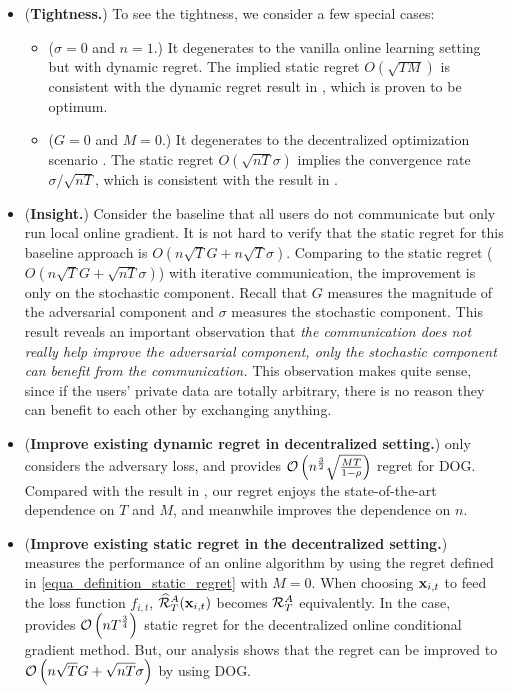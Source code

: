 \documentclass{article}
\begin{document}
\begin{itemize}
\item ({\bf Tightness.}) To see the tightness, we consider a few special cases:
\begin{itemize}
\item ($\sigma= 0$ and $n=1$.) It degenerates to the vanilla online learning setting but with dynamic regret. The implied static regret $O(\sqrt{TM})$ is consistent with the dynamic regret result in \citet{Zhao:2018wx}, which is proven to be optimum. 
\item ($G=0$ and $M=0$.) It degenerates to the decentralized optimization scenario \citet{Duchi:2012hp,Tang:2018un}. The static regret $O(\sqrt{nT}\sigma)$ implies the convergence rate $\sigma / \sqrt{nT}$, which is consistent with the result in \citet{Duchi:2012hp,Tang:2018un}. 
\end{itemize}
\item ({\bf Insight.}) Consider the baseline that all users do not communicate but only run local online gradient. It is not hard to verify that the static regret for this baseline approach is $O(n\sqrt{T}G + n\sqrt{T}\sigma)$. Comparing to the static regret ($O(n\sqrt{T}G + \sqrt{nT}\sigma)$) with iterative communication, the improvement is only on the stochastic component. Recall that $G$ measures the magnitude of the adversarial component and $\sigma$ measures the stochastic component. This result reveals an important observation that \emph{the communication does not really help improve the adversarial component, only the stochastic component can benefit from the communication.} This observation makes quite sense, since if the users' private data are totally arbitrary, there is no reason they can benefit to each other by exchanging anything.
\item ({\bf Improve existing dynamic regret in decentralized setting.}) \citet{8015179Shahram} only considers the adversary loss, and provides ${\mathcal{O}\left( n^{\frac{3}{2}}\sqrt{\frac{MT}{1-\rho}}  \right)}$ regret for DOG. Compared with the result in \citet{8015179Shahram}, our regret enjoys the state-of-the-art dependence on $T$ and $M$, and meanwhile improves the dependence on $n$.
\item ({\bf Improve existing static regret in the decentralized setting.}) 
\citep{pmlr-v70-zhang17g} measures the performance of an online algorithm by using the regret defined in \eqref{equa_definition_static_regret} with $M=0$.  When choosing ${\bf x}_{i,t}$ to feed the loss function $f_{i,t}$, $\widehat{{\mathcal{R}}}_T^{A}({\bf x}_{i,t})$ becomes ${\mathcal{R}}_T^A$ equivalently. In the case, \citet{pmlr-v70-zhang17g} provides ${\mathcal{O}\left( n T^{\frac{3}{4}} \right)}$ static regret for the decentralized online conditional gradient method. But, our analysis shows that the regret can be improved to ${\mathcal{O}\left( n\sqrt{T}G+\sqrt{nT}\sigma \right)}$ by using DOG. 
\end{itemize} 
\end{document}
